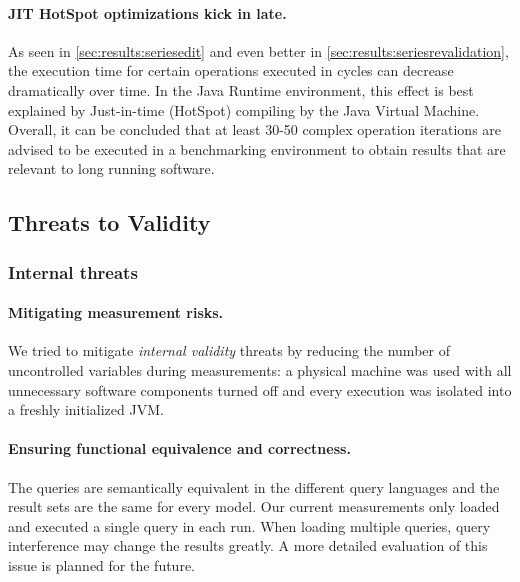\paragraph{JIT HotSpot optimizations kick in late.}
As seen in \autoref{sec:results:seriesedit} and even better in \autoref{sec:results:seriesrevalidation}, the execution time for certain operations executed in cycles can decrease dramatically over time. In the Java Runtime environment, this effect is best explained by Just-in-time (HotSpot) compiling by the Java Virtual Machine. Overall, it can be concluded that at least 30-50 complex operation iterations are advised to be executed in a benchmarking environment to obtain results that are relevant to long running software.

\subsection{Threats to Validity}

\subsubsection{Internal threats}

\paragraph{Mitigating measurement risks.}
We tried to mitigate \emph{internal validity} threats by reducing the number of
uncontrolled variables during measurements: a physical machine was used with all
unnecessary software components turned off and every execution was isolated into
a freshly initialized JVM.

\paragraph{Ensuring functional equivalence and correctness.}
The queries are semantically equivalent in the different query languages and the
result sets are the same for every model. 
Our current measurements only loaded and executed a single query in each run.
When loading multiple queries, query interference may change the results
greatly. A more detailed evaluation of this issue is planned for the future.



